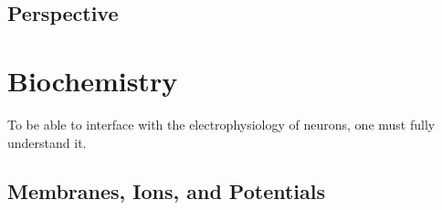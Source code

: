 \section{Perspective}




\chapter{Biochemistry}

To be able to interface with the electrophysiology of neurons, one must fully understand it. 

\section{Membranes, Ions, and Potentials}

